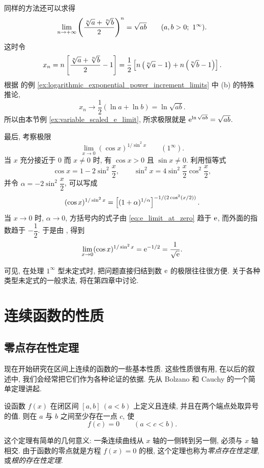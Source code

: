 \label{ex:mean_roots_power_limit}
同样的方法还可以求得
$$
\lim_{n\to+\infty}\left( \frac{\sqrt[n]a+\sqrt[n]b}2 \right)^n
=\sqrt{ab}\qquad(a,b>0;\ 1^\infty).
$$
这时令
$$
x_n=n\left[ \frac{\sqrt[n]a+\sqrt[n]b}2-1 \right]
=\frac12\left[ n\left( \sqrt[n]a-1 \right)+n\left( \sqrt[n]b-1 \right) \right].
$$
根据  的例 \ref{ex:logarithmic_exponential_power_increment_limits} 中 (b) 的特殊推论,
$$
x_n\to\frac12(\ln a+\ln b)=\ln\sqrt{ab}.
$$
所以由本节例 \ref{ex:variable_scaled_e_limit}, 所求极限就是
$\mathrm{e}^{\ln\sqrt{ab}}=\sqrt{ab}$.

\label{ex:cosine_inverse_sine_square_power_limit}
最后, 考察极限
$$
\lim_{x\to0}(\cos x)^{1/\sin^2x}\qquad(1^\infty).
$$
当 $x$ 充分接近于 $0$ 而 $x\neq0$ 时, 有 $\cos x>0$ 且 $\sin x\neq0$.
利用恒等式
$$
\cos x=1-2\sin^2\frac x2,\qquad
\sin^2x=4\sin^2\frac x2\cos^2\frac x2,
$$
并令 $\alpha=-2\sin^2\dfrac x2$, 可以写成
$$
(\cos x)^{1/\sin^2x}
=\left[ (1+\alpha)^{1/\alpha} \right]^{-1/(2\cos^2(x/2))}.
$$
当 $x\to0$ 时, $\alpha\to0$, 方括号内的式子由 \eqref{eq:e_limit_at_zero} 趋于 $\mathrm{e}$,
而外面的指数趋于 $-\dfrac12$.
于是由 , 得到
$$
\lim_{x\to0}(\cos x)^{1/\sin^2x}=\mathrm{e}^{-1/2}=\frac1{\sqrt{\mathrm{e}}}.
$$

可见, 在处理 $1^\infty$ 型未定式时, 把问题直接归结到数 $\mathrm{e}$ 的极限往往很方便.
关于各种类型未定式的一般求法, 将在第四章中讨论.
\flushbottom

\section{连续函数的性质}\label{sec:continuous_function_properties}
\subsection{零点存在性定理}\label{subsec:80}
现在开始研究在区间上连续的函数的一些基本性质.
这些性质很有用, 在以后的叙述中, 我们会经常把它们作为各种论证的依据.
先从 Bolzano 和 Cauchy 的一个简单定理讲起.

\begin{namedtheorem}\label{thm:bolzano_cauchy_zero}
设函数 $f(x)$ 在闭区间 $[a,b]\ (a<b)$ 上定义且连续,
并且在两个端点处取异号的值.
则在 $a$ 与 $b$ 之间至少存在一点 $c$, 使
$$
f(c)=0\qquad(a<c<b).
$$
\end{namedtheorem}

这个定理有简单的几何意义: 一条连续曲线从 $x$ 轴的一侧转到另一侧, 必须与 $x$ 轴相交.
由于函数的零点就是方程 $f(x)=0$ 的根, 这个定理也称为\emph{零点存在性定理},
或\emph{根的存在性定理}.

